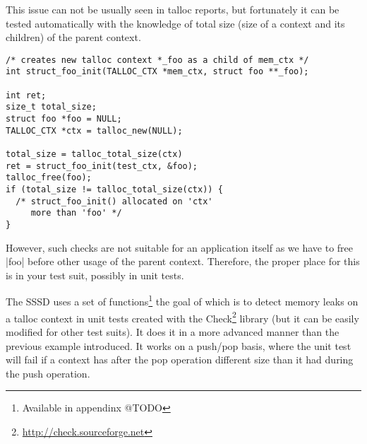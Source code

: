 This issue can not be usually seen in talloc reports, but fortunately it can be
tested automatically with the knowledge of total size (size of a context and
its children) of the parent context.

\begin{lstlisting}[caption={Memory leaks detection \#1},
morekeywords={talloc_total_size,talloc_free}]
/* creates new talloc context *_foo as a child of mem_ctx */
int struct_foo_init(TALLOC_CTX *mem_ctx, struct foo **_foo);

int ret;
size_t total_size;
struct foo *foo = NULL;
TALLOC_CTX *ctx = talloc_new(NULL);

total_size = talloc_total_size(ctx)
ret = struct_foo_init(test_ctx, &foo);
talloc_free(foo);
if (total_size != talloc_total_size(ctx)) {
  /* struct_foo_init() allocated on 'ctx'
     more than 'foo' */
}
\end{lstlisting}

However, such checks are not suitable for an application itself as we have to
free |foo| before other usage of the parent context. Therefore, the proper place
for this is in your test suit, possibly in unit tests.

The SSSD uses a set of functions\footnote{Available in appendinx @TODO} the goal
of which is to detect memory leaks on a talloc context in unit tests created
with the Check\footnote{\url{http://check.sourceforge.net}} library (but it can
be easily modified for other test suits). It does it in a more advanced manner
than the previous example introduced. It works on a push/pop basis, where the
unit test will fail if a context has after the pop operation different size
than it had during the push operation.

